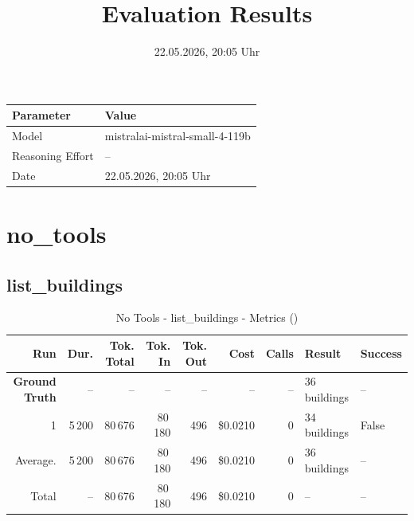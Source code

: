 \documentclass[a4paper,11pt]{article}
\title{Evaluation Results}
\date{22.05.2026, 20:05 Uhr}
\begin{document}
\maketitle

\begin{table}[H]
\centering
\begin{tabular}{l l}
\toprule
\textbf{Parameter} & \textbf{Value} \\
\midrule
Model & mistralai-mistral-small-4-119b \\
Reasoning Effort & -- \\
Date & 22.05.2026, 20:05 Uhr \\
\bottomrule
\end{tabular}
\end{table}

\tableofcontents
\clearpage

\section{no\_tools}

\subsection{list\_buildings}

\begin{table}[ht]
\centering
\scriptsize
\caption{No Tools - list\_buildings - Metrics ()}
\label{tab:no\_tools\_list\_buildings\_metrics\_}
\begin{tabular}{r r r r r r r p{3cm} l}
\hline
Run & Dur. & Tok. Total & Tok. In & Tok. Out & Cost & Calls & Result & Success \\
\hline
\textbf{Ground Truth} & -- & -- & -- & -- & -- & -- & 36 buildings & -- \\
\hline
1 & 5\,200 & 80\,676 & 80\,180 & 496 & \$0.0210 & 0 & 34 buildings & False \\
\hline
Average. & 5\,200 & 80\,676 & 80\,180 & 496 & \$0.0210 & 0 & 36 buildings & -- \\
Total & -- & 80\,676 & 80\,180 & 496 & \$0.0210 & 0 & -- & -- \\
\hline
\end{tabular}
\end{table}

\clearpage
\end{document}
